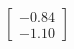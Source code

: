\documentclass[preview]{standalone}
\begin{document}
\begin{align*}
\begin{bmatrix} -0.84 \\ -1.10 \end{bmatrix}
\end{align*}
\end{document}
